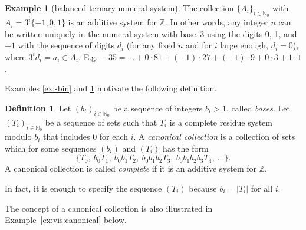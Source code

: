 \documentclass[12pt]{article}
\theoremstyle{definition}
\newtheorem{definition}{Definition}
\newtheorem{example}{Example}
\newcommand{\N}{\mathbb{N}}
\newcommand{\Z}{\mathbb{Z}}
\begin{document}
\begin{example}[balanced ternary numeral system]
\label{ex:b3}
The collection $\{A_i\}_{i\in\N_0}$ with $A_i=3^i\{-1,0,1\}$ is an additive system for $\Z$. In other words, any integer $n$ can be written uniquely in the numeral system with base~3 using the digits 0, 1, and $-1$ with the sequence of digits $d_i$ (for any fixed $n$ and for $i$ large enough, $d_i=0$), where $3^i d_i = a_i\in A_i$. E.g.\ $-35 = ...+0\cdot81+(-1)\cdot27+(-1)\cdot9+0\cdot3+1\cdot1$.
\end{example}

Examples \ref{ex:-bin} and \ref{ex:b3} motivate the following definition.

\begin{definition}
\label{def:main}
Let $(b_i)_{i\in\N_0}$ be a sequence of integers $b_i>1$, called \emph{bases}. Let $(T_i)_{i\in\N_0}$ be a sequence of sets such that $T_i$ is a complete residue system modulo $b_i$ that includes $0$ for each $i$. A \emph{canonical collection} is a collection of sets which for some sequences $(b_i)$ and $(T_i)$ has the form
\[
\{T_0,\ b_0T_1,\ b_0b_1T_2,\ b_0b_1b_2T_3,\ b_0b_1b_2b_3T_4,\ ...\}.
\]
A canonical collection is called \emph{complete} if it is an additive system for $\Z$.
\end{definition}
In fact, it is enough to specify the sequence $(T_i)$ because $b_i=|T_i|$ for all $i$.

The concept of a canonical collection is also illustrated in Example~\ref{ex:vis:canonical} below.
\end{document}

